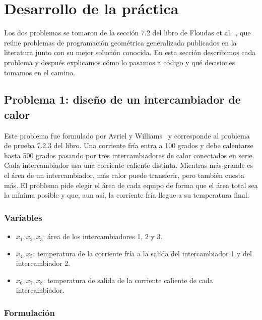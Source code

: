 \section{Desarrollo de la práctica}
\label{sec:desarrollo}

Los dos problemas se tomaron de la sección 7.2 del libro de Floudas et al.~\cite{floudas1999handbook}, que reúne problemas de programación geométrica generalizada publicados en la literatura junto con su mejor solución conocida. En esta sección describimos cada problema y después explicamos cómo lo pasamos a código y qué decisiones tomamos en el camino.

\subsection{Problema 1: diseño de un intercambiador de calor}
\label{sec:problema_hx}

Este problema fue formulado por Avriel y Williams~\cite{avriel1971extension} y corresponde al problema de prueba 7.2.3 del libro. Una corriente fría entra a 100 grados y debe calentarse hasta 500 grados pasando por tres intercambiadores de calor conectados en serie. Cada intercambiador usa una corriente caliente distinta. Mientras más grande es el área de un intercambiador, más calor puede transferir, pero también cuesta más. El problema pide elegir el área de cada equipo de forma que el área total sea la mínima posible y que, aun así, la corriente fría llegue a su temperatura final.

\subsubsection{Variables}

\begin{itemize}
    \item $x_1, x_2, x_3$: área de los intercambiadores 1, 2 y 3.
    \item $x_4, x_5$: temperatura de la corriente fría a la salida del intercambiador 1 y del intercambiador 2.
    \item $x_6, x_7, x_8$: temperatura de salida de la corriente caliente de cada intercambiador.
\end{itemize}

\subsubsection{Formulación}

